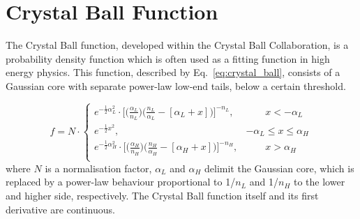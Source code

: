 \section{Crystal Ball Function}
\label{sec:def}
{\fontsize{12pt}{12pt}\selectfont
The Crystal Ball function, developed within the Crystal Ball Collaboration, is a probability density function which is often used as a fitting function in high energy physics. This function, described by Eq.~\ref{eq:crystal_ball}, consists of a Gaussian core with separate power-law low-end tails, below a certain threshold. 

\begin{equation}
\label{eq:crystal_ball}
 f = N \cdot \begin{cases}
     e^{-\frac{1}{2}\alpha^2_{L}} \cdot \bigg[\bigg(\frac{\alpha_{L}}{n_L}\bigg)\bigg(\frac{n_L}{\alpha_{L}}-[\alpha_L \plus x]\bigg)\bigg]^{-n_{L}}, & ~~~~~~~~~x < -\alpha_{L}\\
     e^{-\frac{1}{2}x^2}, & -\alpha_{L} \leq x \leq \alpha_{H}\\
     e^{-\frac{1}{2}\alpha^2_{H}} \cdot \bigg[\bigg(\frac{\alpha_{H}}{n_H}\bigg)\bigg(\frac{n_H}{\alpha_{H}}-[\alpha_H \plus x]\bigg)\bigg]^{-n_{H}}, & ~~~~~~~~~x > \alpha_{H}\\
      \end{cases} 
\end{equation}
where $N$ is a normalisation factor, $\alpha_L$ and $\alpha_H$ delimit the Gaussian core, which is replaced by a power-law behaviour proportional to 1/$n_L$ and 1/$n_H$ to the lower and higher side, respectively. The Crystal Ball function itself and its first derivative are continuous.} %

